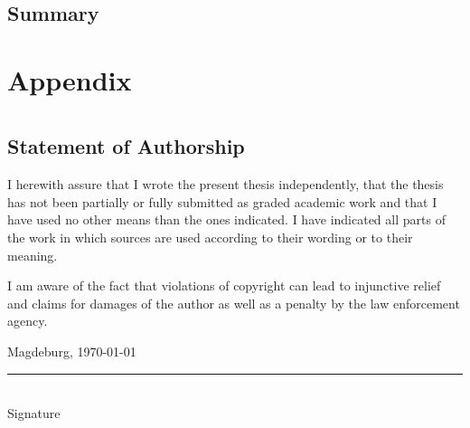 \documentclass[
  12pt,
  a4paper,
  printlength,
  bibliography=totoc,
  chapterprefix,
  headings=openright,
  numbers=endperiod,
  parskip=half,
  twoside
]{scrreprt}
\begin{document}
\section*{Summary}

\lipsum[2]





\appendix

\chapter{Appendix}
\label{cha:appendix}

\chapter*{}

\section*{Statement of Authorship}

I herewith assure that I wrote the present thesis independently, that the thesis has not been partially or fully submitted as graded academic work and that I have used no other means than the ones indicated.
I have indicated all parts of the work in which sources are used according to their wording or to their meaning.

I am aware of the fact that violations of copyright can lead to injunctive relief and claims for damages of the author as well as a penalty by the law enforcement agency.

\bigskip

Magdeburg, \today

\bigskip
\bigskip

\rule{0.5\textwidth}{0.5pt}\\
\hspace*{0.25em}Signature
\end{document}
